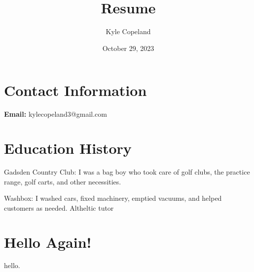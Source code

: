 \documentclass{article} %
\title{Resume} %
\author{Kyle Copeland} %
\date{October 29, 2023} %
\begin{document}
\maketitle %

\section*{Contact Information} %

\textbf{Email:} kylecopeland3@gmail.com                              

\section*{Education History}
{Gadsden Country Club:} I was a bag boy who took care of golf clubs, the practice range, golf carts, and 
other necessities.

{Washbox:} I washed cars, fixed machinery, emptied vacuums, and helped customers as needed.
{Altheltic tutor}




\section{Hello Again!}
hello.
\end{document}
